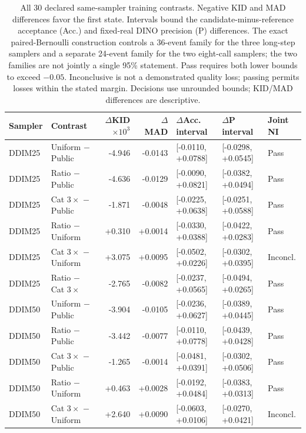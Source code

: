 \begin{table}[t]
\centering\small
\setlength{\tabcolsep}{4pt}
\caption{All 30 declared same-sampler training contrasts. Negative KID and MAD differences favor the first state. Intervals bound the candidate-minus-reference acceptance (Acc.) and fixed-real DINO precision (P) differences. The exact paired-Bernoulli construction controls a 36-event family for the three long-step samplers and a separate 24-event family for the two eight-call samplers; the two families are not jointly a single 95\% statement. Pass requires both lower bounds to exceed $-0.05$. Inconclusive is not a demonstrated quality loss; passing permits losses within the stated margin. Decisions use unrounded bounds; KID/MAD differences are descriptive.}
\label{tab:additional_training_contrasts}
\begin{tabular}{llrrlll}
\toprule
Sampler & Contrast & $\Delta$KID$\times10^3$ & $\Delta$MAD & $\Delta$Acc. interval & $\Delta$P interval & Joint NI \\
\midrule
DDIM25 & Uniform $-$ Public & -4.946 & -0.0143 & [-0.0110, +0.0788] & [-0.0298, +0.0545] & Pass \\
DDIM25 & Ratio $-$ Public & -4.636 & -0.0129 & [-0.0090, +0.0821] & [-0.0382, +0.0494] & Pass \\
DDIM25 & Cat $3\times$ $-$ Public & -1.871 & -0.0048 & [-0.0225, +0.0638] & [-0.0251, +0.0588] & Pass \\
DDIM25 & Ratio $-$ Uniform & +0.310 & +0.0014 & [-0.0330, +0.0388] & [-0.0422, +0.0283] & Pass \\
DDIM25 & Cat $3\times$ $-$ Uniform & +3.075 & +0.0095 & [-0.0502, +0.0226] & [-0.0302, +0.0395] & Inconcl. \\
DDIM25 & Ratio $-$ Cat $3\times$ & -2.765 & -0.0082 & [-0.0237, +0.0565] & [-0.0494, +0.0265] & Pass \\
DDIM50 & Uniform $-$ Public & -3.904 & -0.0105 & [-0.0236, +0.0627] & [-0.0389, +0.0445] & Pass \\
DDIM50 & Ratio $-$ Public & -3.442 & -0.0077 & [-0.0110, +0.0778] & [-0.0439, +0.0428] & Pass \\
DDIM50 & Cat $3\times$ $-$ Public & -1.265 & -0.0014 & [-0.0481, +0.0391] & [-0.0302, +0.0506] & Pass \\
DDIM50 & Ratio $-$ Uniform & +0.463 & +0.0028 & [-0.0192, +0.0484] & [-0.0383, +0.0313] & Pass \\
DDIM50 & Cat $3\times$ $-$ Uniform & +2.640 & +0.0090 & [-0.0603, +0.0106] & [-0.0270, +0.0421] & Inconcl. \\

\end{tabular}
\end{table}
